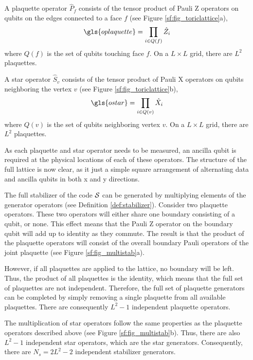 \begin{definition}
  A plaquette operator $\hat{P}_f$ consists of the tensor product of Pauli Z operators on qubits on the edges connected to a face $f$ (see Figure \ref{sf:fig_toriclattice}a),
  \begin{equation}\label{eq:sf_plaquette}
    \gls{oplaquette} = \prod_{i\in Q(f)} \hat{Z}_i
  \end{equation}
  where $Q(f)$ is the set of qubits touching face $f$. On a $L\times L$ grid, there are $L^2$ plaquettes.
\end{definition}

\begin{definition}
  A star operator $\hat{S}_v$ consists of the tensor product of Pauli X operators on qubits neighboring the vertex $v$ (see Figure \ref{sf:fig_toriclattice}b),
  \begin{equation}\label{eq:sf_star}
    \gls{ostar} = \prod_{i\in Q(v)} \hat{X}_i
  \end{equation}
  where $Q(v)$ is the set of qubits neighboring vertex $v$. On a $L\times L$ grid, there are $L^2$ plaquettes.
\end{definition}

As each plaquette and star operator needs to be measured, an ancilla qubit is required at the physical locations of each of these operators. The structure of the full lattice is now clear, as it just a simple square arrangement of alternating data and ancilla qubits in both x and y directions.

The full stabilizer of the code $\mathcal{S}$ can be generated by multiplying elements of the generator operators (see Definition \ref{def:stabilizer}). Consider two plaquette operators. These two operators will either share one boundary consisting of a qubit, or none. This effect means that the Pauli Z operator on the boundary qubit will add up to identity as they commute. The result is that the product of the plaquette operators will consist of the overall boundary Pauli operators of the joint plaquette (see Figure \ref{sf:fig_multistab}a).

However, if all plaquettes are applied to the lattice, no boundary will be left. Thus, the product of all plaquettes is the identity, which means that the full set of plaquettes are not independent. Therefore, the full set of plaquette generators can be completed by simply removing a single plaquette from all available plaquettes. There are consequently $L^2 - 1$ independent plaquette operators.

The multiplication of star operators follow the same properties as the plaquette operators described above (see Figure \ref{sf:fig_multistab}b). Thus, there are also $L^2 - 1$ independent star operators, which are the star generators. Consequently, there are $N_s = 2L^2 - 2$ independent stabilizer generators.


